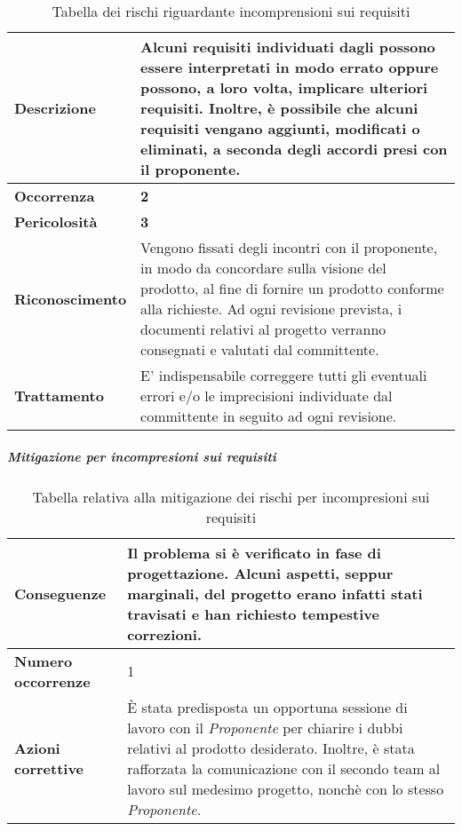 \begin{table}[H]
	\begin{center}
		\begin{tabular}{|l | p{11cm}|}
			\hline
			\textbf{Descrizione}	& Alcuni requisiti individuati dagli \textit{\Anas} possono essere interpretati in modo errato oppure possono, a loro volta, implicare ulteriori requisiti. Inoltre, è possibile che alcuni requisiti vengano aggiunti, modificati o eliminati, a seconda degli accordi presi con il proponente. \\
			\hline
			\textbf{Occorrenza}	&	\textbf{2}	\\
			\hline
			\textbf{Pericolosità}	&	\textbf{3}	\\
			\hline
			\textbf{Riconoscimento}	&	Vengono fissati degli incontri con il proponente, in modo da concordare sulla visione del prodotto, al fine di fornire un prodotto conforme alla richieste. Ad ogni revisione prevista, i documenti relativi al progetto verranno consegnati e valutati dal committente. \\
			\hline
			\textbf{Trattamento}	&	E' indispensabile correggere tutti gli eventuali errori e/o le imprecisioni individuate dal committente in seguito ad ogni revisione.	\\
			\hline
		\end{tabular}
		\caption{Tabella dei rischi riguardante incomprensioni sui requisiti}
	\end{center}
\end{table}

\subparagraph{Mitigazione per incompresioni sui requisiti}

\begin{table}[H]
	\begin{center}
		\begin{tabular}{|l | p{11cm}|}
			\hline
			\textbf{Conseguenze}	&  Il problema si è verificato in fase di progettazione. Alcuni aspetti, seppur
			marginali, del progetto erano infatti stati travisati e han richiesto tempestive correzioni.	\\
			\hline
			\textbf{Numero occorrenze} & 1 \\
			\hline
			\textbf{Azioni correttive}	&	\MakeUppercase{è} stata predisposta un opportuna sessione di lavoro con il \textit{Proponente} per chiarire i dubbi relativi al prodotto desiderato. Inoltre, è stata rafforzata la
			comunicazione con il secondo team al lavoro sul medesimo progetto, nonchè con lo stesso
			\textit{Proponente}.	\\
			\hline
		\end{tabular}
		\caption{Tabella relativa alla mitigazione dei rischi per incompresioni sui requisiti}
	\end{center}
\end{table}




